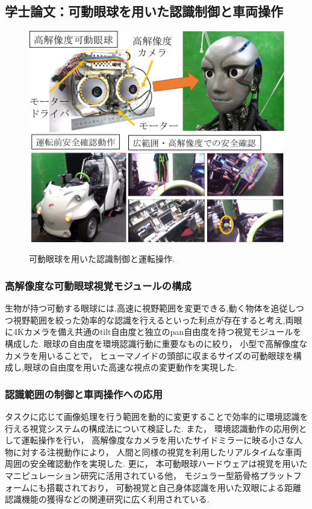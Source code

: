 \documentclass[twocolumn]{d-abst}
\begin{document}
\subsection{学士論文：可動眼球を用いた認識制御と車両操作}

\begin{figure}[tbh]
 \begin{center}
  \begin{minipage}{0.9\columnwidth}
   \includegraphics[width=\columnwidth]{1_eye.pdf}
   \caption{可動眼球を用いた認識制御と運転操作.}
  \end{minipage}
  \label{figure:nowprinting}
 \end{center}
\end{figure}

\subsubsection{高解像度な可動眼球視覚モジュールの構成}
生物が持つ可動する眼球には,高速に視野範囲を変更できる,動く物体を追従しつつ視野範囲を絞った効率的な認識を行えるといった利点が存在すると考え,両眼に4Kカメラを備え共通のtilt自由度と独立のpan自由度を持つ視覚モジュールを構成した.
眼球の自由度を環境認識行動に重要なものに絞り， 小型で高解像度なカメラを用いることで， ヒューマノイドの頭部に収まるサイズの可動眼球を構成し,眼球の自由度を用いた高速な視点の変更動作を実現した.

\subsubsection{認識範囲の制御と車両操作への応用}
タスクに応じて画像処理を行う範囲を動的に変更することで効率的に環境認識を行える視覚システムの構成法について検証した.
また， 環境認識動作の応用例として運転操作を行い， 高解像度なカメラを用いたサイドミラーに映る小さな人物に対する注視動作により， 人間と同様の視覚を利用したリアルタイムな車両周囲の安全確認動作を実現した. 更に， 本可動眼球ハードウェアは視覚を用いたマニピュレーション研究に活用されている他， モジュラー型筋骨格プラットフォームにも搭載されており， 可動視覚と自己身体認識を用いた双眼による距離認識機能の獲得などの関連研究に広く利用されている.
\end{document}
